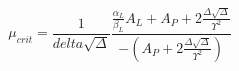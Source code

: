 \begin{equation*}
\mu_{crit} = \frac{1}{delta\sqrt\Delta} \frac{\frac{\alpha_{L}}{\beta_{L}} A_{L} + A_{P} + 2\frac{\Delta\sqrt\Delta}{\varUpsilon^{2}}}{-\left(A_{P} + 2\frac{\Delta\sqrt\Delta}{\varUpsilon^{2}}\right)}
\end{equation*}
